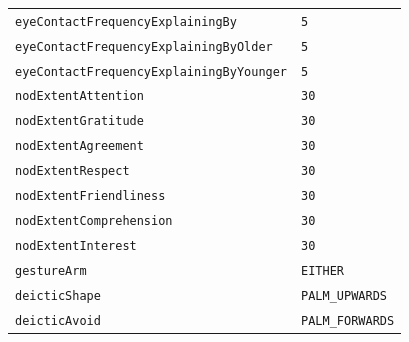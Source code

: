 \documentclass{CSSRforAfrica}
\begin{document}
\begin{table}[H]
\begin{tabular}{l l}
{\footnotesize \verb+eyeContactFrequencyExplainingBy+} 	            & {\footnotesize \verb+5+} \vspace{-1.5mm} \\
{\footnotesize \verb+eyeContactFrequencyExplainingByOlder+} 	    & {\footnotesize \verb+5+} \vspace{-1.5mm} \\
{\footnotesize \verb+eyeContactFrequencyExplainingByYounger+}   & {\footnotesize \verb+5+} \vspace{-1.5mm} \\
{\footnotesize \verb+nodExtentAttention+} 	                                   & {\footnotesize \verb+30+ }\vspace{-1.5mm} \\
{\footnotesize \verb+nodExtentGratitude+} 	                                   & {\footnotesize \verb+30+ }\vspace{-1.5mm} \\
{\footnotesize \verb+nodExtentAgreement+} 	                           & {\footnotesize \verb+30+ }\vspace{-1.5mm} \\
{\footnotesize \verb+nodExtentRespect+} 	                                   & {\footnotesize \verb+30+ }\vspace{-1.5mm} \\
{\footnotesize \verb+nodExtentFriendliness+} 	                           & {\footnotesize \verb+30+ }\vspace{-1.5mm} \\
{\footnotesize \verb+nodExtentComprehension+}                           & {\footnotesize \verb+30+ }\vspace{-1.5mm} \\
{\footnotesize \verb+nodExtentInterest+} 	                                  & {\footnotesize \verb+30+ }\vspace{-1.5mm} \\
{\footnotesize \verb+gestureArm+} 	                                          & {\footnotesize \verb+EITHER+} \vspace{-1.5mm}\\
{\footnotesize \verb+deicticShape+} 	                                          & {\footnotesize \verb+PALM_UPWARDS+} \vspace{-1.5mm}\\
{\footnotesize \verb+deicticAvoid+} 	                                          & {\footnotesize \verb+PALM_FORWARDS+}  \vspace{-1.5mm}\\

\end{tabular}
\end{table}
\end{document}
